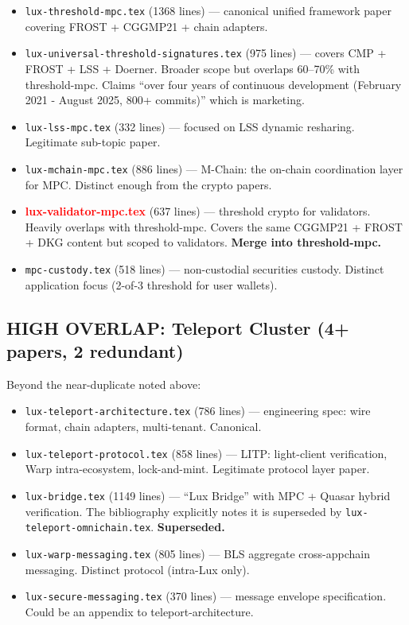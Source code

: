 \documentclass[11pt,a4paper]{article}
\newcommand{\verdict}[1]{\textcolor{red}{\textbf{#1}}}
\begin{document}
\begin{itemize}
\item \texttt{lux-threshold-mpc.tex} (1368 lines) --- canonical unified
      framework paper covering FROST + CGGMP21 + chain adapters.
\item \texttt{lux-universal-threshold-signatures.tex} (975 lines) --- covers
      CMP + FROST + LSS + Doerner. Broader scope but overlaps 60--70\% with
      threshold-mpc. Claims ``over four years of continuous development
      (February 2021 - August 2025, 800+ commits)'' which is marketing.
\item \texttt{lux-lss-mpc.tex} (332 lines) --- focused on LSS dynamic
      resharing. Legitimate sub-topic paper.
\item \texttt{lux-mchain-mpc.tex} (886 lines) --- M-Chain: the on-chain
      coordination layer for MPC. Distinct enough from the crypto papers.
\item \verdict{lux-validator-mpc.tex} (637 lines) --- threshold crypto for
      validators. Heavily overlaps with threshold-mpc. Covers the same CGGMP21
      + FROST + DKG content but scoped to validators. \textbf{Merge into
      threshold-mpc.}
\item \texttt{mpc-custody.tex} (518 lines) --- non-custodial securities
      custody. Distinct application focus (2-of-3 threshold for user wallets).
\end{itemize}

\subsection{HIGH OVERLAP: Teleport Cluster (4+ papers, 2 redundant)}

Beyond the near-duplicate noted above:
\begin{itemize}
\item \texttt{lux-teleport-architecture.tex} (786 lines) --- engineering spec:
      wire format, chain adapters, multi-tenant. Canonical.
\item \texttt{lux-teleport-protocol.tex} (858 lines) --- LITP: light-client
      verification, Warp intra-ecosystem, lock-and-mint. Legitimate protocol
      layer paper.
\item \texttt{lux-bridge.tex} (1149 lines) --- ``Lux Bridge'' with MPC +
      Quasar hybrid verification. The bibliography explicitly notes it is
      superseded by \texttt{lux-teleport-omnichain.tex}. \textbf{Superseded.}
\item \texttt{lux-warp-messaging.tex} (805 lines) --- BLS aggregate
      cross-appchain messaging. Distinct protocol (intra-Lux only).
\item \texttt{lux-secure-messaging.tex} (370 lines) --- message envelope
      specification. Could be an appendix to teleport-architecture.
\end{itemize}
\end{document}
